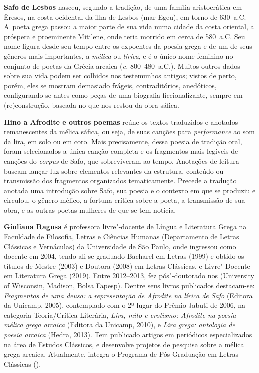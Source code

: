 \textbf{Safo de Lesbos} nasceu, segundo a tradição, de uma família 
aristocrática em Êresos, na costa ocidental da ilha de Lesbos
(mar Egeu), em torno de 630~a.C. A~poeta grega passou a maior parte de
sua vida numa cidade da costa oriental, a próspera e proeminente Mitilene, onde
teria morrido em cerca de 580~a.C. Seu nome figura desde seu tempo entre os
expoentes da poesia grega e de um de seus gêneros mais importantes, a
\textit{mélica} ou \textit{lírica}, e é o único nome feminino no conjunto de
poetas da Grécia arcaica (\textit{c.} 800–480~a.C.). Muitos outros dados sobre
sua vida podem ser colhidos nos testemunhos antigos; vistos de perto, porém,
eles se mostram demasiado frágeis, contraditórios, anedóticos, configurando-se
antes como peças de uma biografia ficcionalizante, sempre em (re)construção,
baseada no que nos restou da obra sáfica.

\textbf{Hino a Afrodite e outros poemas} reúne os textos traduzidos e anotados 
remanescentes da mélica sáfica, ou seja, de suas canções para \textit{performance} 
ao som da lira, em solo ou em coro. Mais precisamente, dessa poesia de
tradição oral, foram selecionados a única canção completa e os fragmentos mais legíveis  
de canções do \textit{corpus} de Safo, que sobreviveram ao tempo. 
Anotações de leitura buscam lançar luz sobre elementos
relevantes da estrutura, conteúdo ou transmissão dos fragmentos organizados
tematicamente. Precede a tradução anotada uma introdução sobre Safo, sua poesia
e o contexto em que se produziu e circulou, o gênero mélico, a fortuna crítica
sobre a poeta, a transmissão de sua obra, e as outras poetas mulheres de que
se tem notícia. 

\textbf{Giuliana Ragusa} é professora livre"-docente de Língua e Literatura Grega na Faculdade de Filosofia, Letras e Ciências Humanas (Departamento de Letras Clássicas e Vernáculas) da Universidade de São Paulo, onde ingressou como docente em 2004, tendo ali se graduado Bacharel em Letras (1999) e obtido os títulos de Mestre (2003) e Doutora (2008) em Letras Clássicas, e Livre"-Docente em Literatura Grega (2019). Entre 2012--2013, fez pós"-doutorado nos  (University of Wisconsin, Madison, Bolsa Fapesp). Dentre seus livros publicados destacam-se: 
\textit{Fragmentos de uma deusa: a representação de Afrodite
na lírica de Safo} (Editora da Unicamp, 2005), contemplado com o 2º lugar do 
Prêmio Jabuti de 2006, na categoria Teoria/Crítica Literária,
\textit{Lira, mito e erotismo: Afrodite na poesia mélica grega arcaica} 
(Editora da Unicamp, 2010), e \textit{Lira grega: antologia de poesia arcaica} (Hedra, 2013). 
Tem publicado artigos em periódicos especializados na
área de Estudos Clássicos, e desenvolve projetos de pesquisa sobre a mélica grega arcaica. Atualmente, integra o Programa de Pós-Graduação em Letras Clássicas ().





